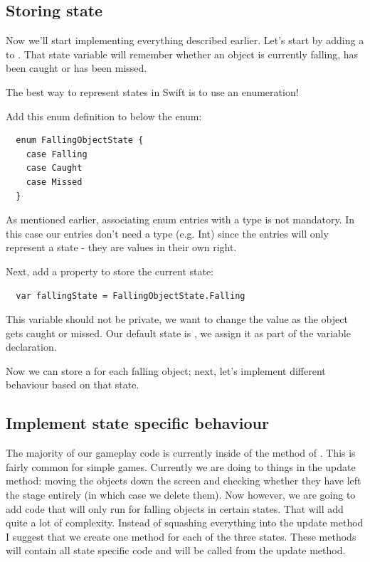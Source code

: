\subsection{Storing state}
Now we'll start implementing everything described earlier. Let's start by adding
a  to . That state
variable will remember whether an object is currently falling, has been caught
or has been missed.

The best way to represent states in Swift is to use an enumeration!
\begin{leftbar}
Add this enum definition to  below the
 enum:
\begin{lstlisting}
  enum FallingObjectState {
    case Falling
    case Caught
    case Missed
  }
\end{lstlisting}
\end{leftbar}
As mentioned earlier, associating enum entries with a type is not
mandatory. In this case our entries don't need a type (e.g. Int) since the
entries will only represent a state - they are values in their own right.

\begin{leftbar}
Next, add a property to store the current state:
\begin{lstlisting}
  var fallingState = FallingObjectState.Falling
\end{lstlisting}
\end{leftbar}
This variable should not be private, we want to change the value as
the object gets caught or missed. Our default state is , we
assign it as part of the variable declaration.

Now we can store a  for each falling object; next,
let's implement different behaviour based on that state.

\subsection{Implement state specific behaviour}
The majority of our gameplay code is currently inside of the 
method of . This is fairly common for simple games.
Currently we are doing to things in the update method: moving the objects down
the screen and checking whether they have left the stage entirely (in which
case we delete them). Now however, we are going to add code that will only run
for falling objects in certain states. That will add quite a lot of complexity.
Instead of squashing everything into the update method I suggest that we
create one method for each of the three states. These methods will contain
all state specific code and will be called from the update method.

